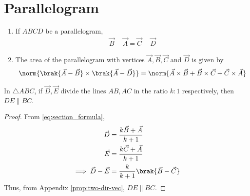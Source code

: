 \section{Parallelogram}
\begin{enumerate}[label=\thesection.\arabic*.,ref=\thesection.\theenumi]
  \item If $ABCD$ be a parallelogram,
	  \label{prop:two-pgm}
  \begin{align}
	  \label{eq:two-pgm}
 \vec{B}-\vec{A} = \vec{C} -\vec{D}
  \end{align}
\item The area of the parallelogram with vertices $\vec{A}, \vec{B}, \vec{C}$ and $\vec{D}$ is given by 
  \label{prop:pgm2d}
\begin{align}
  \label{eq:pgm2d}
	\norm{\brak{\vec{A}-\vec{B}} \times \brak{\vec{A}-\vec{D}}}
 = 
 \norm{\vec{A} \times \vec{B}+\vec{B} \times \vec{C}+\vec{C} \times \vec{A}}
  \end{align}
\end{enumerate}
  \iffalse
  \item In $\triangle ABC$, if $\vec{D}, \vec{E}$ divide the lines $AB, AC$ in the ratio $k:1$ respectively,  then $DE \parallel BC$.
	  \label{prop:two-tri-bpt}
	  \begin{proof}
		  From 
	  \eqref{eq:section_formula}, 
  \begin{align}
	  \vec{D}&= \frac{k\vec{B}+ \vec{A}}{k+1}
	  \\
	  \vec{E}&= \frac{k\vec{C}+ \vec{A}}{k+1}
	  \\
	  \implies 
	  \vec{D}-	  \vec{E}&= \frac{k}{k+1}\brak{\vec{B}- \vec{C}}
  \end{align}
  Thus, from 
		  Appendix \ref{prop:two-dir-vec}, $DE \parallel BC$.

	  \end{proof}

